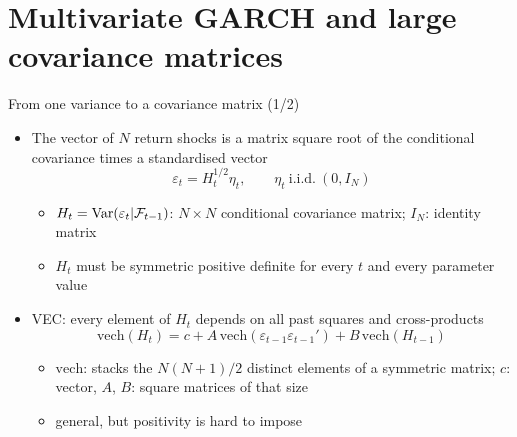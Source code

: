 \section{Multivariate GARCH and large covariance matrices}

\begin{frame}{From one variance to a covariance matrix (1/2)}
\itemsize{\small}
\begin{itemize}
    \item The vector of $N$ return shocks is a matrix square root of the conditional covariance times a standardised vector
    \[ \varepsilon_t = H_t^{1/2}\eta_t, \qquad \eta_t \ \text{i.i.d.}\ (0, I_N) \]
    \begin{itemize}
        \item $H_t = \text{Var}(\varepsilon_t | \mathcal F_{t-1})$: $N \times N$ conditional covariance matrix; $I_N$: identity matrix
        \item $H_t$ must be symmetric positive definite for every $t$ and every parameter value
    \end{itemize}
    \item VEC: every element of $H_t$ depends on all past squares and cross-products
    \[ \mathrm{vech}(H_t) = c + A\,\mathrm{vech}(\varepsilon_{t-1}\varepsilon_{t-1}') + B\,\mathrm{vech}(H_{t-1}) \]
    \begin{itemize}
        \item $\mathrm{vech}$: stacks the $N(N+1)/2$ distinct elements of a symmetric matrix; $c$: vector, $A$, $B$: square matrices of that size
        \item general, but positivity is hard to impose
    \end{itemize}
\end{itemize}
\end{frame}

